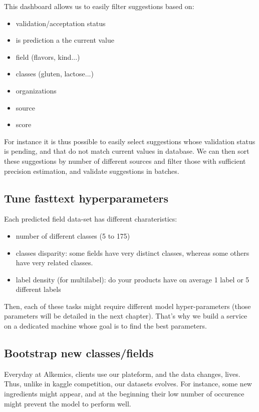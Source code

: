 This dashboard allows us to easily filter suggestions based on:
\begin{multicols}{2}
\begin{itemize} 
	\item validation/acceptation status
	\item is prediction a the current value
	\item field (flavors, kind...)
	\item classes (gluten, lactose...)
	\item organizations
	\item source 
	\item score 
\end{itemize}
\end{multicols}

For instance it is thus possible to easily select suggestions whose validation status is pending, and that do not match current values in database. We can then sort these suggestions by number of different sources and filter those with sufficient precision estimation, and validate suggestions in batches.


\subsection{Tune fasttext hyperparameters}

Each predicted field data-set has different charateristics:
\begin{itemize}
	\item number of different classes (5 to 175)
	\item classes disparity: some fields have very distinct classes, whereas some others have very related classes.
	\item label density (for multilabel): do your products have on average 1 label or 5 different labels
\end{itemize}

Then, each of these tasks might require different model hyper-parameters (those parameters will be detailed in the next chapter).
That's why we build a service on a dedicated machine whose goal is to find the best parameters.

\subsection{Bootstrap new classes/fields}

Everyday at Alkemics, clients use our plateform, and the data changes, lives. Thus, unlike in kaggle competition, our datasets evolves.
For instance, some new ingredients might appear, and at the beginning their low number of occurence might prevent the model to perform well.

